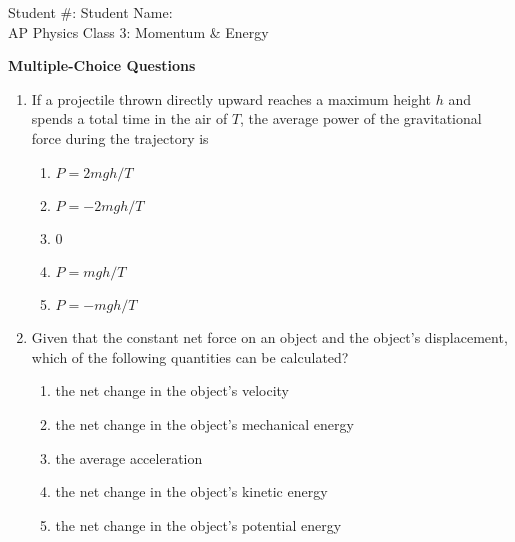 \documentclass[12pt]{article}
\begin{document}
\pagestyle{empty}
\begin{center}
  Student \#: \underline{\hspace{1in}}\hspace{1.9in}
  Student Name: \underline{\hspace{2in}}\\
  \vspace{0.3in}
  {\LARGE
    AP Physics \hspace{0.75in}
    Class 3: Momentum \& Energy
  }
\end{center}

\textbf{Multiple-Choice Questions}

\begin{enumerate}[leftmargin=15pt]
  
\item If a projectile thrown directly upward reaches a maximum height $h$ and
  spends a total time in the air of $T$, the average power of the gravitational
  force during the trajectory is
  \begin{enumerate}[noitemsep,topsep=0pt]
  \item $P=2mgh/T$
  \item $P=-2mgh/T$
  \item 0
  \item $P=mgh/T$
  \item $P=-mgh/T$
  \end{enumerate}

\item Given that the constant net force on an object and the object's 
  displacement, which of the following quantities can be calculated?
  \begin{enumerate}[noitemsep,topsep=0pt]
  \item the net change in the object's velocity
  \item the net change in the object's mechanical energy
  \item the average acceleration
  \item the net change in the object's kinetic energy
  \item the net change in the object's potential energy
  \end{enumerate}


\end{enumerate}
\end{document}
